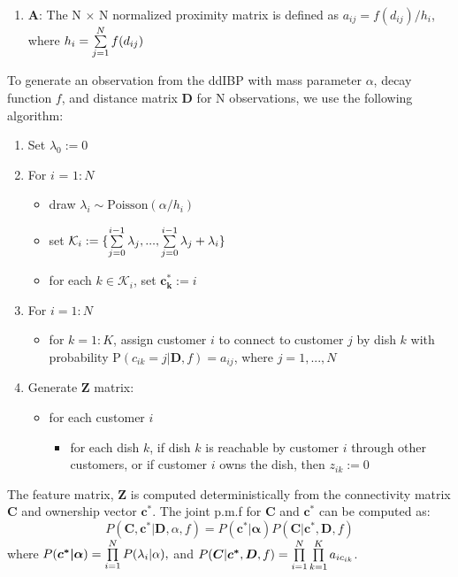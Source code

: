 \begin{enumerate}
  \item $\bm A$: The N $\times$ N normalized proximity matrix is defined as
                 $a_{ij} = f(d_{ij}) / h_i$, where $h_i = \sum\limits_{j=1}^{N} f(d_{ij})$
\end{enumerate}

\noindent
To generate an observation from the ddIBP with mass parameter $\alpha$, decay
function $f$, and distance matrix $\bm D$ for N observations, we use the following
algorithm:

\begin{enumerate}
  \item Set $\lambda_0:=0$

  \item For $i$ = $1:N$
    \begin{itemize}
      \item draw $\lambda_i \sim \text{Poisson}(\alpha / h_i) $
      \item set $\mathcal{K}_i:= 
            \{\sum\limits_{j=0}^{i-1} \lambda_j,...,\sum\limits_{j=0}^{i-1} \lambda_j+\lambda_i \}$
      \item for each $k \in \mathcal{K}_i$, set $\bm{c_k^*}:=i$
    \end{itemize}

  \item For $i=1:N$
    \begin{itemize}
      \item for $k = 1:K$, assign customer $i$ to connect to customer $j$ by 
            dish $k$ with probability P$(c_{ik}=j|\bm D,f) = a_{ij}$, where
            $j = 1,...,N$ 
    \end{itemize}

  \item Generate $\bm Z$ matrix: 
    \begin{itemize}
      \item for each customer $i$
      \begin{itemize}
        \item for each dish $k$,
              if dish $k$ is reachable by customer $i$ through other customers,
              or if customer $i$ owns the dish, then $z_{ik}:=0$
      \end{itemize}
    \end{itemize}
\end{enumerate}

\noindent
The feature matrix, $\bm Z$ is computed deterministically from the connectivity 
matrix $\bm C$ and ownership vector $\bm{c^*}$. The joint p.m.f for $\bm C$ and 
$\bm c^*$ can be computed as:
\begin{equation}
  P(\bm C, \bm{c^*}|\bm D,\alpha,f) = P(\bm{c^*|\alpha}) P(\bm C|\bm{c^*},\bm D,f)
\end{equation}
where $P(\bm{c^*|\alpha}) = \prod\limits_{i=1}^{N} P(\lambda_i|\alpha),$ and 
$P(\bm C|\bm{c^*},\bm D,f) = \prod\limits_{i=1}^{N}\prod\limits_{k=1}^{K}a_{ic_{ik}}$.\\

